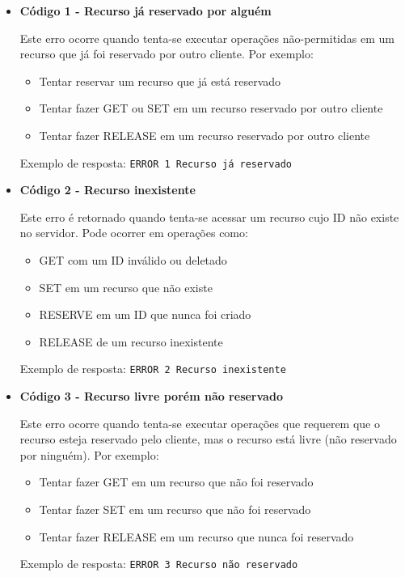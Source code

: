 \documentclass{article}
\begin{document}
\begin{itemize}
	\item \textbf{Código 1 - Recurso já reservado por alguém}
	
	Este erro ocorre quando tenta-se executar operações não-permitidas em um recurso que já foi reservado por outro cliente. Por exemplo:
	\begin{itemize}
		\item Tentar reservar um recurso que já está reservado
		\item Tentar fazer GET ou SET em um recurso reservado por outro cliente
		\item Tentar fazer RELEASE em um recurso reservado por outro cliente
	\end{itemize}
	
	Exemplo de resposta: \texttt{{ERROR} 1 Recurso já reservado}
	
	\item \textbf{Código 2 - Recurso inexistente}
	
	Este erro é retornado quando tenta-se acessar um recurso cujo ID não existe no servidor. Pode ocorrer em operações como:
	\begin{itemize}
		\item GET com um ID inválido ou deletado
		\item SET em um recurso que não existe
		\item RESERVE em um ID que nunca foi criado
		\item RELEASE de um recurso inexistente
	\end{itemize}
	
	Exemplo de resposta: \texttt{{ERROR} 2 Recurso inexistente}
	
	\item \textbf{Código 3 - Recurso livre porém não reservado}
	
	Este erro ocorre quando tenta-se executar operações que requerem que o recurso esteja reservado pelo cliente, mas o recurso está livre (não reservado por ninguém). Por exemplo:
	\begin{itemize}
		\item Tentar fazer GET em um recurso que não foi reservado
		\item Tentar fazer SET em um recurso que não foi reservado
		\item Tentar fazer RELEASE em um recurso que nunca foi reservado
	\end{itemize}
	
	Exemplo de resposta: \texttt{{ERROR} 3 Recurso não reservado}
	

\end{itemize}
\end{document}
